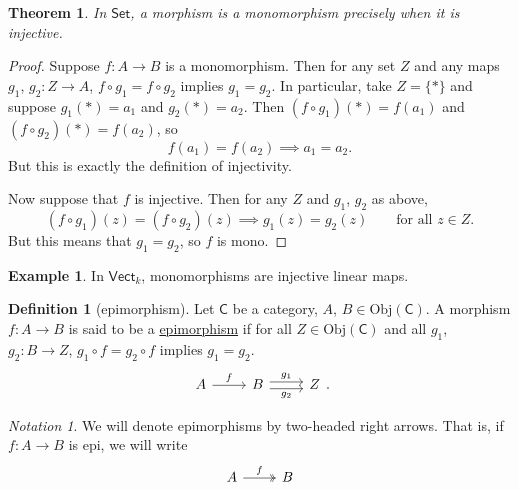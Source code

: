\documentclass[a4paper,10pt]{scrreprt}
\newcommand{\defn}[1]{\ul{#1}}
\newcommand{\Obj}{\mathrm{Obj}}
\theoremstyle{definition}
\newtheorem{definition}{Definition}[section]
\newtheorem{example}{Example}[section]
\theoremstyle{plain}
\newtheorem{theorem}{Theorem}[section]
\theoremstyle{remark}
\newtheorem{notation}{Notation}[section]
\begin{document}
\begin{theorem}
  In $\mathsf{Set}$, a morphism is a monomorphism precisely when it is injective.
\end{theorem}
\begin{proof}
  Suppose $f\colon A \to B$ is a monomorphism. Then for any set $Z$ and any maps $g_{1}$, $g_{2}\colon Z \to A$, $f \circ g_{1} = f \circ g_{2}$ implies $g_{1} = g_{2}$. In particular, take $Z = \{*\}$ and suppose $g_{1}(*) = a_{1}$ and $g_{2}(*) = a_{2}$. Then $(f \circ g_{1})(*) = f(a_{1})$ and $(f \circ g_{2})(*) = f(a_{2})$, so
  \begin{equation*}
    f(a_{1}) = f(a_{2}) \implies a_{1} = a_{2}.
  \end{equation*}
  But this is exactly the definition of injectivity.

  Now suppose that $f$ is injective. Then for any $Z$ and $g_{1}$, $g_{2}$ as above,
  \begin{equation*}
    (f \circ g_{1})(z) = (f \circ g_{2})(z) \implies g_{1}(z) = g_{2}(z)\qquad\text{for all } z \in Z.
  \end{equation*}
  But this means that $g_{1} = g_{2}$, so $f$ is mono.
\end{proof}

\begin{example}
  \label{eg:monomorphismsinkvect}
  In $\mathsf{Vect}_{k}$, monomorphisms are injective linear maps.
\end{example}

\begin{definition}[epimorphism]
  \label{def:epimorphism}
  Let $\mathsf{C}$ be a category, $A$, $B\in \Obj(\mathsf{C})$. A morphism $f\colon A \to B$ is said to be a \defn{epimorphism} if for all $Z \in \Obj(\mathsf{C})$ and all $g_{1}$, $g_{2}\colon B \to Z$, $g_{1} \circ f = g_{2}\circ f$ implies $g_{1} = g_{2}$.
  \begin{equation*}
    \begin{tikzcd}
      A \arrow[r, "f"] & B \arrow[r, shift left, "g_{1}"] \arrow[r, shift right, swap, "g_{2}"] & Z
    \end{tikzcd}.
  \end{equation*}
\end{definition}

\begin{notation}
  We will denote epimorphisms by two-headed right arrows. That is, if $f\colon A \to B$ is epi, we will write
  \begin{equation*}
    \begin{tikzcd}
      A
      \arrow[r, twoheadrightarrow, "f"]
      & B
    \end{tikzcd}
  \end{equation*}
\end{notation}
\end{document}

